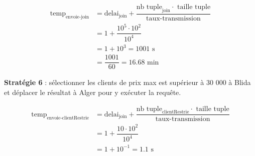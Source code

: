 \documentclass{article}
\begin{document}
\begin{align*}
    \text{temp}_{\text{envoie-join}} &= \text{delai}_{\text{join}} + \dfrac{\text{nb tuple}_{\text{join}} \cdot \text{ taille tuple}}{\text{taux-transmission}}\\[0.15cm]
                                   &= 1 + \dfrac{10^5 \cdot 10^2}{10^4} \\[0.15cm]
                                   &= 1 + 10^3 = 1001 \text{ s}\\[0.15cm]
                                   &= \dfrac{1001}{60} = 16.68 \text{ min}
\end{align*}

\textbf{Stratégie 6} : sélectionner les clients de prix max est supérieur à 30 000 à
Blida et déplacer le résultat à Alger pour y exécuter la requête.

\begin{align*}
    \text{temp}_{\text{envoie-clientRestrie}} &= \text{delai}_{\text{join}} + \dfrac{\text{nb tuple}_{\text{clientRestrie}} \cdot \text{ taille tuple}}{\text{taux-transmission}}\\[0.15cm]
                                   &= 1 + \dfrac{10 \cdot 10^2}{10^4} \\[0.15cm]
                                   &= 1 + 10^{-1} = 1.1 \text{ s}\\[0.15cm]
\end{align*}
\end{document}
